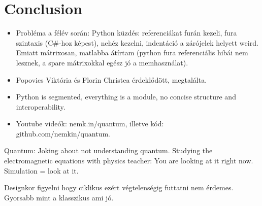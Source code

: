 \chapter{Conclusion}

\begin{itemize}
    \item Probléma a félév során: Python küzdés: referenciákat furán kezeli, fura szintaxis (C\#-hoz képest), nehéz kezelni, indentáció a zárójelek helyett weird. Emiatt mátrixosan, matlabba átírtam (python fura referenciális hibái nem lesznek, a spare mátrixokkal egész jó a memhasználat).
    \item Popovics Viktória és Florin Christea érdeklődött, megtalálta.
    \item Python is segmented, everything is a module, no concise structure and interoperability.
    \item Youtube videók: nemk.in/quantum, illetve kód: github.com/nemkin/quantum.
\end{itemize}

Quantum: Joking about not understanding quantum. Studying the electromagnetic equations with physics teacher: You are looking at it right now. Simulation = look at it.

Designkor figyelni hogy ciklikus ezért végtelenségig futtatni nem érdemes. Gyorsabb mint a klasszikus ami jó.